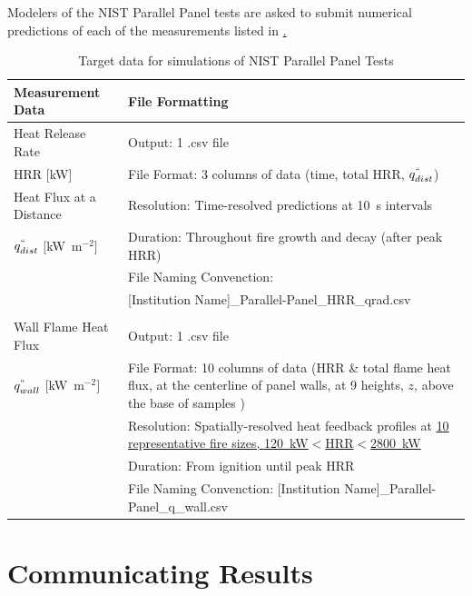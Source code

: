 \documentclass[12pt]{article}
\begin{document}
Modelers of the NIST Parallel Panel tests are asked to submit numerical predictions of each of the measurements listed in \href{table:Parallel-Panel}.
\begin{table}[htb]
\caption{\label{table:Parallel-Panel} Target data for simulations of NIST Parallel Panel Tests}
\begin{tabular}{p{0.25\linewidth} | p{0.75\linewidth}}
\hline
\textbf{Measurement Data}       	& \textbf{File Formatting } \\
\hline
Heat Release Rate 	& Output: 1 .csv file\\
HRR $[$kW$]$& File Format: 3 columns of data (time, total HRR, $q^{``}_{dist}$)\\
Heat Flux at a Distance	& Resolution: Time-resolved predictions at 10~s intervals \\
$q^{``}_{dist}$ $[$kW~m$^{-2}$$]$	& Duration: Throughout fire growth and decay (after peak HRR) \\
	& File Naming Convenction: \\
	& [Institution Name]\_Parallel-Panel\_HRR\_qrad.csv \\
&	\\
Wall Flame Heat Flux & Output: 1 .csv file\\
$q^{``}_{wall}$ $[$kW~m$^{-2}$$]$& File Format: 10 columns of data (HRR \& total flame heat flux, at the centerline of panel walls, at 9 heights, $z$, above the base of samples )\\
	& Resolution: Spatially-resolved heat feedback profiles at \href{https://github.com/MaCFP/macfp-db/blob/master/Fire_Growth/NIST_Parallel_Panel/Experimental_Data/PMMA_heatflux.csv}{10 representative fire sizes, 120~kW$<$HRR$<$2800~kW}\\
	& Duration: From ignition until peak HRR \\
	& File Naming Convenction: [Institution Name]\_Parallel-Panel\_q\_wall.csv \\
\hline
\end{tabular}
\end{table}


\clearpage
\section{Communicating Results}
\label{Sec:Com-Results}
\end{document}
